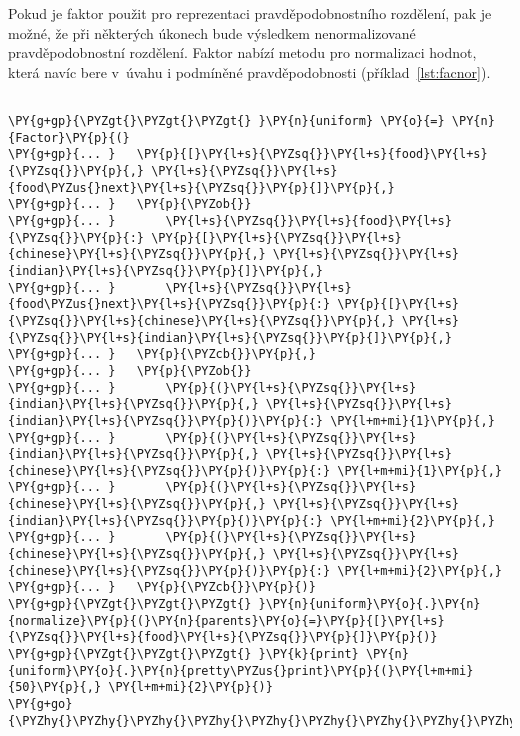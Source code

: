 Pokud je faktor použit pro reprezentaci pravděpodobnostního rozdělení, pak je možné, že při některých úkonech bude výsledkem nenormalizované pravděpodobnostní rozdělení.
Faktor nabízí metodu pro normalizaci hodnot, která navíc bere v~úvahu i podmíněné pravděpodobnosti (příklad~\ref{lst:facnor}).

\begin{example}
\begin{Verbatim}[commandchars=\\\{\}]

\PY{g+gp}{\PYZgt{}\PYZgt{}\PYZgt{} }\PY{n}{uniform} \PY{o}{=} \PY{n}{Factor}\PY{p}{(}
\PY{g+gp}{... }   \PY{p}{[}\PY{l+s}{\PYZsq{}}\PY{l+s}{food}\PY{l+s}{\PYZsq{}}\PY{p}{,} \PY{l+s}{\PYZsq{}}\PY{l+s}{food\PYZus{}next}\PY{l+s}{\PYZsq{}}\PY{p}{]}\PY{p}{,}
\PY{g+gp}{... }   \PY{p}{\PYZob{}}
\PY{g+gp}{... }       \PY{l+s}{\PYZsq{}}\PY{l+s}{food}\PY{l+s}{\PYZsq{}}\PY{p}{:} \PY{p}{[}\PY{l+s}{\PYZsq{}}\PY{l+s}{chinese}\PY{l+s}{\PYZsq{}}\PY{p}{,} \PY{l+s}{\PYZsq{}}\PY{l+s}{indian}\PY{l+s}{\PYZsq{}}\PY{p}{]}\PY{p}{,}
\PY{g+gp}{... }       \PY{l+s}{\PYZsq{}}\PY{l+s}{food\PYZus{}next}\PY{l+s}{\PYZsq{}}\PY{p}{:} \PY{p}{[}\PY{l+s}{\PYZsq{}}\PY{l+s}{chinese}\PY{l+s}{\PYZsq{}}\PY{p}{,} \PY{l+s}{\PYZsq{}}\PY{l+s}{indian}\PY{l+s}{\PYZsq{}}\PY{p}{]}\PY{p}{,}
\PY{g+gp}{... }   \PY{p}{\PYZcb{}}\PY{p}{,}
\PY{g+gp}{... }   \PY{p}{\PYZob{}}
\PY{g+gp}{... }       \PY{p}{(}\PY{l+s}{\PYZsq{}}\PY{l+s}{indian}\PY{l+s}{\PYZsq{}}\PY{p}{,} \PY{l+s}{\PYZsq{}}\PY{l+s}{indian}\PY{l+s}{\PYZsq{}}\PY{p}{)}\PY{p}{:} \PY{l+m+mi}{1}\PY{p}{,}
\PY{g+gp}{... }       \PY{p}{(}\PY{l+s}{\PYZsq{}}\PY{l+s}{indian}\PY{l+s}{\PYZsq{}}\PY{p}{,} \PY{l+s}{\PYZsq{}}\PY{l+s}{chinese}\PY{l+s}{\PYZsq{}}\PY{p}{)}\PY{p}{:} \PY{l+m+mi}{1}\PY{p}{,}
\PY{g+gp}{... }       \PY{p}{(}\PY{l+s}{\PYZsq{}}\PY{l+s}{chinese}\PY{l+s}{\PYZsq{}}\PY{p}{,} \PY{l+s}{\PYZsq{}}\PY{l+s}{indian}\PY{l+s}{\PYZsq{}}\PY{p}{)}\PY{p}{:} \PY{l+m+mi}{2}\PY{p}{,}
\PY{g+gp}{... }       \PY{p}{(}\PY{l+s}{\PYZsq{}}\PY{l+s}{chinese}\PY{l+s}{\PYZsq{}}\PY{p}{,} \PY{l+s}{\PYZsq{}}\PY{l+s}{chinese}\PY{l+s}{\PYZsq{}}\PY{p}{)}\PY{p}{:} \PY{l+m+mi}{2}\PY{p}{,}
\PY{g+gp}{... }   \PY{p}{\PYZcb{}}\PY{p}{)}
\PY{g+gp}{\PYZgt{}\PYZgt{}\PYZgt{} }\PY{n}{uniform}\PY{o}{.}\PY{n}{normalize}\PY{p}{(}\PY{n}{parents}\PY{o}{=}\PY{p}{[}\PY{l+s}{\PYZsq{}}\PY{l+s}{food}\PY{l+s}{\PYZsq{}}\PY{p}{]}\PY{p}{)}
\PY{g+gp}{\PYZgt{}\PYZgt{}\PYZgt{} }\PY{k}{print} \PY{n}{uniform}\PY{o}{.}\PY{n}{pretty\PYZus{}print}\PY{p}{(}\PY{l+m+mi}{50}\PY{p}{,} \PY{l+m+mi}{2}\PY{p}{)}
\PY{g+go}{\PYZhy{}\PYZhy{}\PYZhy{}\PYZhy{}\PYZhy{}\PYZhy{}\PYZhy{}\PYZhy{}\PYZhy{}\PYZhy{}\PYZhy{}\PYZhy{}\PYZhy{}\PYZhy{}\PYZhy{}\PYZhy{}\PYZhy{}\PYZhy{}\PYZhy{}\PYZhy{}\PYZhy{}\PYZhy{}\PYZhy{}\PYZhy{}\PYZhy{}\PYZhy{}\PYZhy{}\PYZhy{}\PYZhy{}\PYZhy{}\PYZhy{}\PYZhy{}\PYZhy{}\PYZhy{}\PYZhy{}\PYZhy{}\PYZhy{}\PYZhy{}\PYZhy{}\PYZhy{}\PYZhy{}\PYZhy{}\PYZhy{}\PYZhy{}\PYZhy{}\PYZhy{}\PYZhy{}\PYZhy{}\PYZhy{}\PYZhy{}}

\end{Verbatim}
\end{example}
